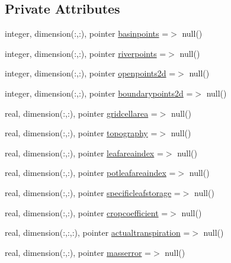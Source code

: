 \subsection*{Private Attributes}
\begin{DoxyCompactItemize}
\item 
integer, dimension(\+:,\+:), pointer \mbox{\hyperlink{structmodulebasin_1_1t__extvar_a533e7a3b5cc9ceb44a4752d8b965de6c}{basinpoints}} =$>$ null()
\item 
integer, dimension(\+:,\+:), pointer \mbox{\hyperlink{structmodulebasin_1_1t__extvar_afb4e8bd6c77c2f0286cb0a57fd47d9a8}{riverpoints}} =$>$ null()
\item 
integer, dimension(\+:,\+:), pointer \mbox{\hyperlink{structmodulebasin_1_1t__extvar_a71691c0630d55a8a2340f9143a25df0c}{openpoints2d}} =$>$ null()
\item 
integer, dimension(\+:,\+:), pointer \mbox{\hyperlink{structmodulebasin_1_1t__extvar_a6e57b92c3bf1cffe6ee8504d367096d0}{boundarypoints2d}} =$>$ null()
\item 
real, dimension(\+:,\+:), pointer \mbox{\hyperlink{structmodulebasin_1_1t__extvar_a85ad0877dac632c42d7270c06ce345a9}{gridcellarea}} =$>$ null()
\item 
real, dimension(\+:,\+:), pointer \mbox{\hyperlink{structmodulebasin_1_1t__extvar_a5f497a8f619e77f57406f93924b0a0d3}{topography}} =$>$ null()
\item 
real, dimension(\+:,\+:), pointer \mbox{\hyperlink{structmodulebasin_1_1t__extvar_aa9843b38bfdbb7a0cb719f44082ea6af}{leafareaindex}} =$>$ null()
\item 
real, dimension(\+:,\+:), pointer \mbox{\hyperlink{structmodulebasin_1_1t__extvar_af663c38516023fe20374b6ec7d46cf2f}{potleafareaindex}} =$>$ null()
\item 
real, dimension(\+:,\+:), pointer \mbox{\hyperlink{structmodulebasin_1_1t__extvar_af581c0bb7220e1daff7abf12afe23558}{specificleafstorage}} =$>$ null()
\item 
real, dimension(\+:,\+:), pointer \mbox{\hyperlink{structmodulebasin_1_1t__extvar_a2c1fe554cc98ed65907b887a3fe134f9}{cropcoefficient}} =$>$ null()
\item 
real, dimension(\+:,\+:,\+:), pointer \mbox{\hyperlink{structmodulebasin_1_1t__extvar_a3bc567b97f21c1ee8da11b44bed16c8b}{actualtranspiration}} =$>$ null()
\item 
real, dimension(\+:,\+:), pointer \mbox{\hyperlink{structmodulebasin_1_1t__extvar_adf94255a24b635448c1a11d739faa98e}{masserror}} =$>$ null()
\end{DoxyCompactItemize}


